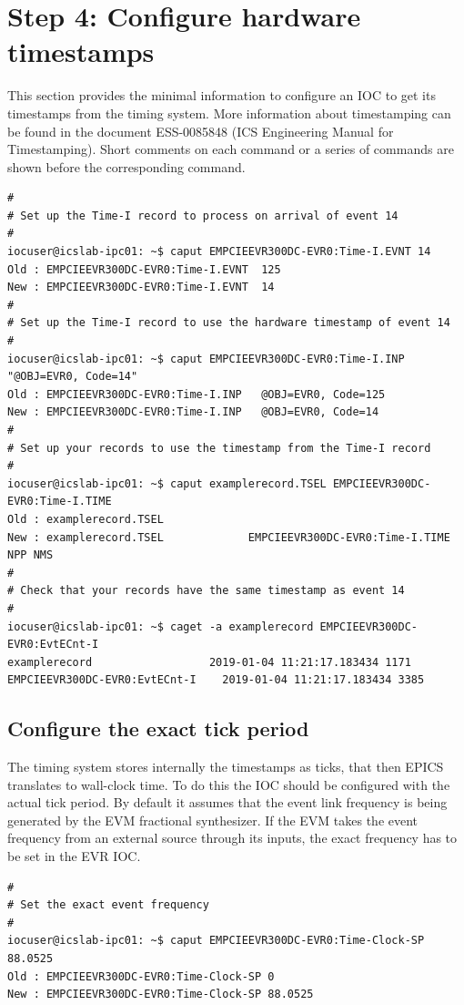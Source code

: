 \documentclass[11pt
  , a4paper
  , article
  , oneside
  , showtrims
]{memoir}
\begin{document}
{\section{Step 4: Configure hardware timestamps}
This section provides the minimal information to configure an IOC to get its timestamps from the timing system. More information about timestamping can be found in the document ESS-0085848 (ICS Engineering Manual for Timestamping). Short comments on each command or a series of commands are shown before the corresponding command.
\begin{lstlisting}[style=termstyle]
#
# Set up the Time-I record to process on arrival of event 14
#
iocuser@icslab-ipc01: ~$ caput EMPCIEEVR300DC-EVR0:Time-I.EVNT 14
Old : EMPCIEEVR300DC-EVR0:Time-I.EVNT  125
New : EMPCIEEVR300DC-EVR0:Time-I.EVNT  14
#
# Set up the Time-I record to use the hardware timestamp of event 14
#
iocuser@icslab-ipc01: ~$ caput EMPCIEEVR300DC-EVR0:Time-I.INP "@OBJ=EVR0, Code=14"
Old : EMPCIEEVR300DC-EVR0:Time-I.INP   @OBJ=EVR0, Code=125
New : EMPCIEEVR300DC-EVR0:Time-I.INP   @OBJ=EVR0, Code=14
#
# Set up your records to use the timestamp from the Time-I record
#
iocuser@icslab-ipc01: ~$ caput examplerecord.TSEL EMPCIEEVR300DC-EVR0:Time-I.TIME
Old : examplerecord.TSEL
New : examplerecord.TSEL             EMPCIEEVR300DC-EVR0:Time-I.TIME NPP NMS
#
# Check that your records have the same timestamp as event 14
#
iocuser@icslab-ipc01: ~$ caget -a examplerecord EMPCIEEVR300DC-EVR0:EvtECnt-I
examplerecord                  2019-01-04 11:21:17.183434 1171
EMPCIEEVR300DC-EVR0:EvtECnt-I    2019-01-04 11:21:17.183434 3385
\end{lstlisting}

\subsection{Configure the exact tick period}
The timing system stores internally the timestamps as ticks, that then EPICS translates to wall-clock time. To do this the IOC should be configured with the actual tick period. By default it assumes that the event link frequency is being generated by the EVM fractional synthesizer. If the EVM takes the event frequency from an external source through its inputs, the exact frequency has to be set in the EVR IOC.
\begin{lstlisting}[style=termstyle]
#
# Set the exact event frequency
#
iocuser@icslab-ipc01: ~$ caput EMPCIEEVR300DC-EVR0:Time-Clock-SP 88.0525
Old : EMPCIEEVR300DC-EVR0:Time-Clock-SP 0
New : EMPCIEEVR300DC-EVR0:Time-Clock-SP 88.0525
\end{lstlisting}


}
\end{document}
